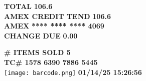 \documentclass{article}
\begin{document}
\begin{center}
\begin{tabbing}
        \textbf{\hspace{4.75cm}TOTAL} \> \textbf{\hspace{4.3cm} 106.6} \\
        \textbf{\hspace{2.45cm}AMEX CREDIT TEND} \> \textbf{\hspace{4.3cm} 106.6} \\
        \textbf{\hspace{2.7cm}AMEX} \textbf{**** **** **** 4069} \\
        \textbf{\hspace{3.7cm}CHANGE DUE} \> \textbf{\hspace{4.7cm}0.00} \\
    \end{tabbing}
    
    \vspace{-2mm}

    \textbf{\huge{\# ITEMS SOLD 5}}\\
    \vspace{0.5cm}
    \textbf{TC\# 1578 6390 7886 5445}\\
    \texttt{[image: barcode.png]} %
    \vspace{0.5cm}
    \textbf{01/14/25 15:26:56}
\end{center}  
\end{document}
